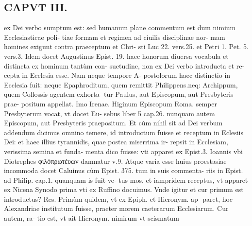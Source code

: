 \documentclass{article}
\begin{document}
\begin{pages}
\section*{CAPVT  III. }\pstart ex Dei verbo sumptum est: sed humanum plane commentum est dum nimium Ecclesiasticae poli- tiae formam et regimen ad ciuilis disciplinae nor- mam homines exigunt contra praeceptum et Chri- sti Luc 22. vers.25. et Petri 1. Pet. 5. vers.3. Idem docet Augustinus Epist. 19. haec honorum diuersa vocabula et distincta ex hominum tantùm con- suetudine, non ex Dei verbo introducta et re- cepta in Ecclesia esse. Nam neque tempore A- postolorum haec distinctio in Ecclesia fuit: neque Epaphroditum, quem remittit Philippens.neq: Archippum, quem Collossis agentem exhorta- tur Paulus, aut Episcopum, aut Presbyteris prae- positum appellat. Imo Irenae. Higinum Episcopum Roma. semper Presbyterum vocat, vt docet Eu- sebus liber 5 cap.26. nunquam autem Episcopum, aut Presbyteris praepositum. Et cùm nihil sit ad Dei verbum addendum dicimus omnino temere, id introductum fuisse et receptum in Eclesiis Dei: et haec illius tyrannidis, quae postea miserrima ir- repsit in Ecclesiam, verissima semina et funda- menta dico fuisse: vti apparet ex Epist.3. Ioannis vbi Diotrephes φιλόπρωτέυων damnatur v.9. Atque  varia esse huius proestasiae incommoda docet Caluinus cùm Epist. 375. tum in suis commenta- riis in Epist. ad Philip. cap.1. quanquam is fuit ve- tus mos, et iampridem receptus, vt apparet ex Nicena Synodo prima vti ex Ruffino docuimus. Vnde igitur et cur primum est introductus? Res. Primùm quidem, vt ex Epiph. et Hieronym. ap- paret, hoc Alexandriae institutum fuisse, praeter morem caeterarum Ecclesiarum. Cur autem, ra- tio est, vt ait Hieronym. nimirum vt scismatum  \pend

\end{pages}
\end{document}
